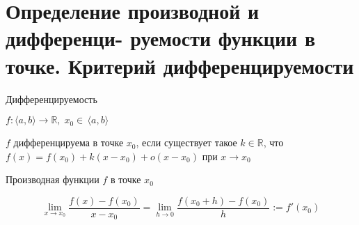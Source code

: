 \section{Определение производной и дифференци- руемости функции в точке. Критерий дифференцируемости}
\begin{conj}
    Дифференцируемость

    $f: \langle a, b \rangle \to \mathbb{R}, \; x_0 \in \, \langle a, b \rangle$

    $f$ дифференцируема в точке $x_0$, если существует такое $k \in \mathbb{R}$, 
    что $f(x) = f(x_0) + k(x - x_0) + o(x - x_0)$ при $x \to x_0$
\end{conj}

\begin{conj}
    Производная функции $f$ в точке $x_0$

    \[ \lim_{x \to x_0} \frac{f(x) - f(x_0)}{x - x_0} = \lim_{h \to 0} \frac{f(x_0 + h) - f(x_0)}{h}
    := f'(x_0) \]
\end{conj}

